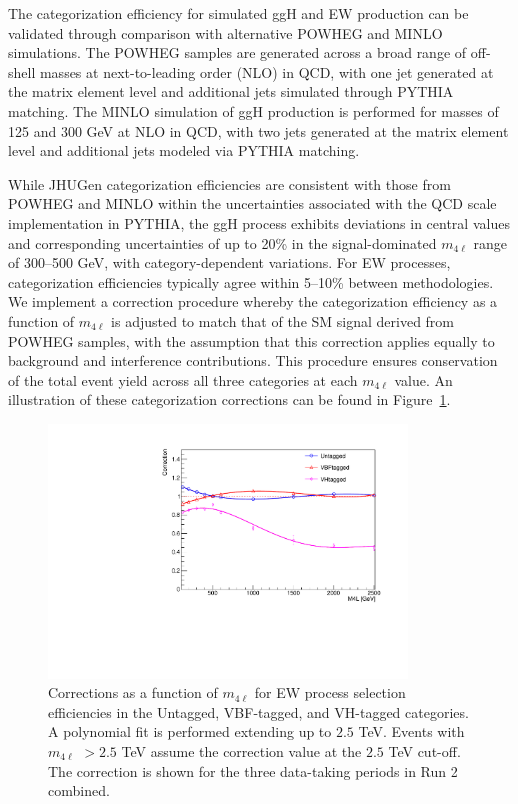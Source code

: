 The categorization efficiency for simulated ggH and EW \Hboson production can be validated through comparison with alternative POWHEG and MINLO simulations. 
The POWHEG samples are generated across a broad range of off-shell \Hboson masses at next-to-leading order (NLO) in QCD, with one jet generated at the matrix element level and additional jets simulated through PYTHIA matching. 
The MINLO simulation of ggH production is performed for \Hboson masses of 125 and $300$ GeV at NLO in QCD, with two jets generated at the matrix element level and additional jets modeled via PYTHIA matching.

While JHUGen categorization efficiencies are consistent with those from POWHEG and MINLO within the uncertainties associated with the QCD scale implementation in PYTHIA,
the ggH process exhibits deviations in central values and corresponding uncertainties of up to 20\% in the signal-dominated $m_{4\ell}$ range of 300--500 GeV, with category-dependent variations. 
For EW processes, categorization efficiencies typically agree within 5--10\% between methodologies. 
We implement a correction procedure whereby the categorization efficiency as a function of $m_{4\ell}$ is adjusted to match that of the SM signal derived from POWHEG samples, with the assumption that this correction applies equally to background and interference contributions. 
This procedure ensures conservation of the total event yield across all three categories at each $m_{4\ell}$ value. An illustration of these categorization corrections can be found in Figure~\ref{fig:ew_catcor}.

\begin{figure}[h!]
\centering
\includegraphics[width=0.85\textwidth]{figures/Corrections_allyears.pdf}
\caption {
Corrections as a function of $m_{4\ell}$ for \offshell EW process selection efficiencies in the Untagged, VBF-tagged, and VH-tagged categories. A polynomial fit is performed extending up to $2.5$ TeV. Events with $m_{4\ell}$ $ >  2.5$ TeV assume the correction value at the $2.5$ TeV cut-off. The correction is shown for the three data-taking periods in Run 2 combined.
\label{fig:ew_catcor}}
\end{figure}

